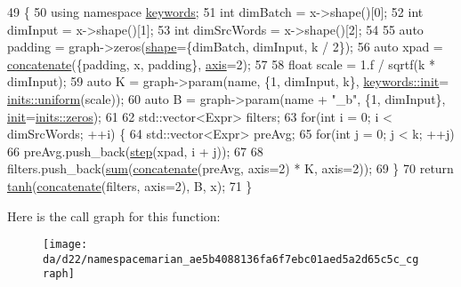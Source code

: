 \begin{DoxyCode}
49                                               \{
50     \textcolor{keyword}{using namespace }\hyperlink{namespacekeywords}{keywords};
51     \textcolor{keywordtype}{int} dimBatch = x->shape()[0];
52     \textcolor{keywordtype}{int} dimInput = x->shape()[1];
53     \textcolor{keywordtype}{int} dimSrcWords = x->shape()[2];
54 
55     \textcolor{keyword}{auto} padding = graph->zeros(\hyperlink{namespacemarian_1_1keywords_a5933d683efd12b59e17a7131fa64cf1c}{shape}=\{dimBatch, dimInput, k / 2\});
56     \textcolor{keyword}{auto} xpad = \hyperlink{namespacemarian_a2791a2c8f79a938f5cb22ae613680675}{concatenate}(\{padding, x, padding\}, \hyperlink{namespacemarian_1_1keywords_ace9158eabbddaca833133f12da98b9d6}{axis}=2);
57 
58     \textcolor{keywordtype}{float} scale = 1.f / sqrtf(k * dimInput);
59     \textcolor{keyword}{auto} K = graph->param(name, \{1, dimInput, k\}, \hyperlink{amunmt_8cpp_a2e8ddb8bd2f3405f554c9f2c52277f4b}{keywords::init}=
      \hyperlink{namespacemarian_1_1inits_a835dcbebcc1ee135e5637b2225eaf9d1}{inits::uniform}(scale));
60     \textcolor{keyword}{auto} B = graph->param(name + \textcolor{stringliteral}{"\_b"}, \{1, dimInput\}, \hyperlink{amunmt_8cpp_a2e8ddb8bd2f3405f554c9f2c52277f4b}{init}=\hyperlink{namespacemarian_1_1inits_a1bd34fd256e3df7bb1e27955a7f2b359}{inits::zeros});
61 
62     std::vector<Expr> filters;
63     \textcolor{keywordflow}{for}(\textcolor{keywordtype}{int} i = 0; i < dimSrcWords; ++i) \{
64       std::vector<Expr> preAvg;
65       \textcolor{keywordflow}{for}(\textcolor{keywordtype}{int} j = 0; j < k; ++j)
66         preAvg.push\_back(\hyperlink{namespacemarian_a2e7193e67292a4c3347f296f5e669581}{step}(xpad, i + j));
67 
68       filters.push\_back(\hyperlink{namespacemarian_a460460a6de63beebc5d968b44d49d11b}{sum}(\hyperlink{namespacemarian_a2791a2c8f79a938f5cb22ae613680675}{concatenate}(preAvg, axis=2) * K, axis=2));
69     \}
70     \textcolor{keywordflow}{return} \hyperlink{namespacemarian_ab84fcdb2b1fa95f89e3921aea4027957}{tanh}(\hyperlink{namespacemarian_a2791a2c8f79a938f5cb22ae613680675}{concatenate}(filters, axis=2), B, x);
71 \}
\end{DoxyCode}


Here is the call graph for this function\+:
\nopagebreak
\begin{figure}[H]
\begin{center}
\leavevmode
\texttt{[image: da/d22/namespacemarian\_ae5b4088136fa6f7ebc01aed5a2d65c5c\_cgraph]}
\end{center}
\end{figure}




